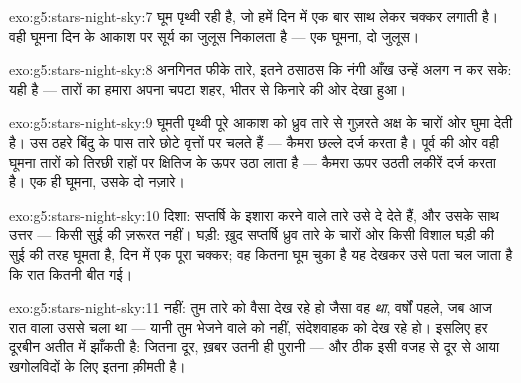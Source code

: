 \begin{solution}{exo:g5:stars-night-sky:7}
घूम पृथ्वी रही है, जो हमें दिन में एक बार साथ लेकर चक्कर लगाती है।
वही घूमना दिन के आकाश पर सूर्य का जुलूस निकालता है --- एक घूमना, दो
जुलूस।
\end{solution}

\begin{solution}{exo:g5:stars-night-sky:8}
अनगिनत फीके तारे, इतने ठसाठस कि नंगी आँख उन्हें अलग न कर सके: यही
 है --- तारों का हमारा अपना चपटा शहर, भीतर से किनारे की ओर
देखा हुआ।
\end{solution}

\begin{solution}{exo:g5:stars-night-sky:9}
घूमती पृथ्वी पूरे आकाश को ध्रुव तारे से गुज़रते अक्ष के चारों ओर घुमा
देती है। उस ठहरे बिंदु के पास तारे छोटे वृत्तों पर चलते हैं ---
कैमरा छल्ले दर्ज करता है। पूर्व की ओर वही घूमना तारों को तिरछी राहों
पर क्षितिज के ऊपर उठा लाता है --- कैमरा ऊपर उठती लकीरें दर्ज करता है।
एक ही घूमना, उसके दो नज़ारे।
\end{solution}

\begin{solution}{exo:g5:stars-night-sky:10}
दिशा: सप्तर्षि के इशारा करने वाले तारे उसे  दे देते हैं, और
उसके साथ उत्तर --- किसी सुई की ज़रूरत नहीं। घड़ी: ख़ुद सप्तर्षि ध्रुव
तारे के चारों ओर किसी विशाल घड़ी की सुई की तरह घूमता है, दिन में एक
पूरा चक्कर; वह कितना घूम चुका है यह देखकर उसे पता चल जाता है कि रात
कितनी बीत गई।
\end{solution}

\begin{solution}{exo:g5:stars-night-sky:11}
नहीं: तुम तारे को वैसा देख रहे हो जैसा वह \emph{था}, वर्षों पहले, जब
आज रात वाला  उससे चला था --- यानी तुम भेजने वाले को नहीं,
संदेशवाहक को देख रहे हो। इसलिए हर दूरबीन अतीत में झाँकती है: 
जितना दूर, ख़बर उतनी ही पुरानी --- और ठीक इसी वजह से दूर से आया
 खगोलविदों के लिए इतना क़ीमती है।
\end{solution}
